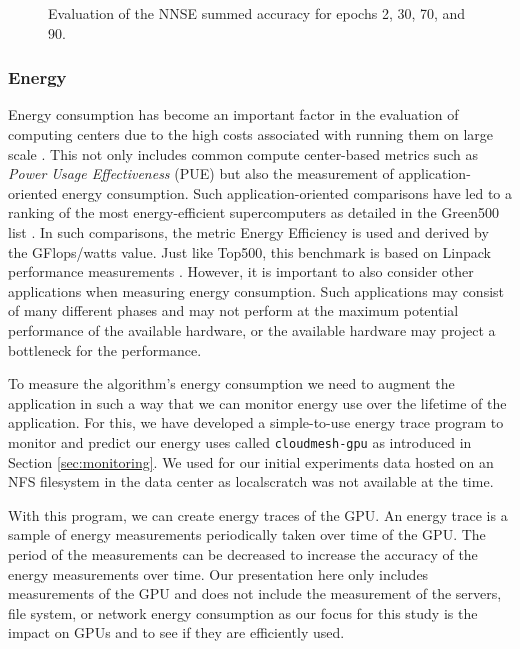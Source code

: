 \documentclass[utf8]{FrontiersinVancouver} %
\begin{document}
\begin{figure}[p]
\begin{center}
  \end{center}

  \caption {Evaluation of the NNSE summed accuracy for epochs 2, 30, 70, and 90.}
  \label{fig:NNSE-comparison-a100-summed}

\end{figure}

\subsubsection{Energy}
\label{sec:perf-energy}


Energy consumption has become an important factor in the evaluation of computing centers due to the high costs associated with running them on large scale . This not only includes common compute center-based metrics such as {\em Power Usage Effectiveness} (PUE) but also the measurement of application-oriented energy consumption.  Such application-oriented comparisons have led to a ranking of the most energy-efficient supercomputers as detailed in the Green500 list \citep{green500}. In such comparisons, the metric Energy Efficiency is used and derived by the GFlops/watts value. Just like Top500, this benchmark is based on Linpack performance measurements \cite{www-top500}.  However, it is important to also consider other applications when measuring energy consumption. Such applications may consist of many different phases and may not perform at the maximum potential performance of the available hardware, or the available hardware may project a bottleneck for the performance.

To measure the algorithm's energy consumption we need to augment the application in such a way that we can monitor energy use over the lifetime of the application. For this, we have developed a simple-to-use energy trace program to monitor and predict our energy uses called \verb|cloudmesh-gpu| as introduced in Section \ref{sec:monitoring}.  We used for our initial experiments data hosted on an NFS filesystem in the data center as localscratch was not available at the time.


With this program, we can create energy traces of the GPU. An energy trace is a sample of energy measurements periodically taken over time of the GPU. The period of the measurements can be decreased to increase the accuracy of the energy measurements over time. Our presentation here only includes measurements of the GPU and does not include the measurement of the servers, file system, or network energy consumption as our focus for this study is the impact on GPUs and to see if they are efficiently used.
\end{document}
